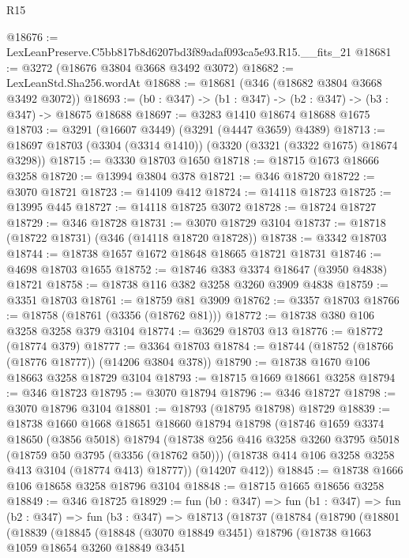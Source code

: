 \begin{lexlean}{R15}
\begin{coremodule}
@18676 := LexLeanPreserve.C5bb817b8d6207bd3f89adaf093ca5e93.R15.__fits_21
@18681 := @3272 (@18676 @3804 @3668 @3492 @3072)
@18682 := LexLeanStd.Sha256.wordAt
@18688 := @18681 (@346 (@18682 @3804 @3668 @3492 @3072))
@18693 := (b0 : @347) -> (b1 : @347) -> (b2 : @347) -> (b3 : @347) -> @18675 @18688
@18697 := @3283 @1410 @18674 @18688 @1675
@18703 := @3291 (@16607 @3449) (@3291 (@4447 @3659) @4389)
@18713 := @18697 @18703 (@3304 (@3314 @1410)) (@3320 (@3321 (@3322 @1675) @18674 @3298))
@18715 := @3330 @18703 @1650
@18718 := @18715 @1673 @18666 @3258
@18720 := @13994 @3804 @378
@18721 := @346 @18720
@18722 := @3070 @18721
@18723 := @14109 @412
@18724 := @14118 @18723
@18725 := @13995 @445
@18727 := @14118 @18725 @3072
@18728 := @18724 @18727
@18729 := @346 @18728
@18731 := @3070 @18729 @3104
@18737 := @18718 (@18722 @18731) (@346 (@14118 @18720 @18728))
@18738 := @3342 @18703
@18744 := @18738 @1657 @1672 @18648 @18665 @18721 @18731
@18746 := @4698 @18703 @1655
@18752 := @18746 @383 @3374 @18647 (@3950 @4838) @18721
@18758 := @18738 @116 @382 @3258 @3260 @3909 @4838
@18759 := @3351 @18703
@18761 := @18759 @81 @3909
@18762 := @3357 @18703
@18766 := @18758 (@18761 (@3356 (@18762 @81)))
@18772 := @18738 @380 @106 @3258 @3258 @379 @3104
@18774 := @3629 @18703 @13
@18776 := @18772 (@18774 @379)
@18777 := @3364 @18703
@18784 := @18744 (@18752 (@18766 (@18776 @18777)) (@14206 @3804 @378))
@18790 := @18738 @1670 @106 @18663 @3258 @18729 @3104
@18793 := @18715 @1669 @18661 @3258
@18794 := @346 @18723
@18795 := @3070 @18794
@18796 := @346 @18727
@18798 := @3070 @18796 @3104
@18801 := @18793 (@18795 @18798) @18729
@18839 := @18738
    @1660
    @1668
    @18651
    @18660
    @18794
    @18798
    (@18746
      @1659
      @3374
      @18650
      (@3856 @5018)
      @18794
      (@18738
        @256
        @416
        @3258
        @3260
        @3795
        @5018
        (@18759 @50 @3795 (@3356 (@18762 @50)))
        (@18738 @414 @106 @3258 @3258 @413 @3104 (@18774 @413) @18777))
      (@14207 @412))
@18845 := @18738 @1666 @106 @18658 @3258 @18796 @3104
@18848 := @18715 @1665 @18656 @3258
@18849 := @346 @18725
@18929 := fun (b0 : @347) =>
  fun (b1 : @347) =>
  fun (b2 : @347) =>
  fun (b3 : @347) =>
  @18713
    (@18737
      (@18784
        (@18790
          (@18801
            (@18839
              (@18845
                (@18848
                  (@3070 @18849 @3451)
                  @18796
                  (@18738
                    @1663
                    @1059
                    @18654
                    @3260
                    @18849
                    @3451

\end{coremodule}
\end{lexlean}
